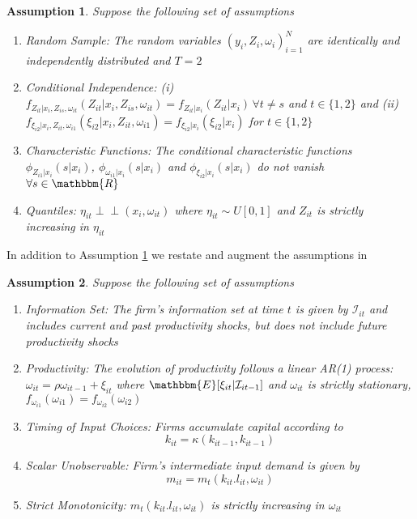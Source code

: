 \documentclass[11pt]{article}
\newtheorem{assump}{Assumption}[section]
\newcommand{\indep}{\perp \!\!\! \perp}
\begin{document}
\begin{assump} \label{idpart1}
Suppose the following set of assumptions 
	\begin{enumerate}[label=(\alph*)]
		\item Random Sample: The random variables $(y_{i}, Z_{i}, \omega_{i})_{i=1}^{N}$ are identically and independently distributed and $T=2$
		\item Conditional Independence: (i) $f_{Z_{it}|x_{i}, Z_{is}, \omega_{it}}(Z_{it}|x_{i}, Z_{is}, \omega_{it})=f_{Z_{it}|x_{i}}(Z_{it}|x_{i})\, \forall t\neq s$ and $t\in\{1,2\}$ and (ii) $f_{\xi_{i2}|x_{i}, Z_{it}, \omega_{i1}}(\xi_{i2}|x_{i}, Z_{it}, \omega_{i1})=f_{\xi_{i2}|x_{i}}(\xi_{i2}|x_{i})$ for $t\in\{1,2\}$
		\item Characteristic Functions: The conditional characteristic functions $\phi_{Z_{i1}|x_{i}}(s|x_{i})$, $\phi_{\omega_{i1}|x_{i}}(s|x_{i})$ and $\phi_{\xi_{i2}|x_{i}}(s|x_{i})$  do not vanish $\forall s\in \mathbbm{R}$
		\item Quantiles: $\eta_{it}\indep (x_{i}, \omega_{it})$ where $\eta_{it}\sim U[0,1]$ and $Z_{it}$ is strictly increasing in $\eta_{it}$
	\end{enumerate}
\end{assump}
In addition to Assumption \ref{idpart1} we restate and augment the assumptions in \cite{Ackerberg2015}
\begin{assump} \label{idpart2}
Suppose the following set of assumptions 
	\begin{enumerate}[label=(\alph*)]
		\item Information Set: The firm's information set at time $t$ is given by $\mathcal{I}_{it}$ and includes current and past productivity shocks, but does not include future productivity shocks
		\item Productivity: The evolution of productivity follows a linear AR(1) process: $\omega_{it}=\rho\omega_{it-1}+\xi_{it}$ where $\mathbbm{E}[\xi_{it}|\mathcal{I}_{it-1}]$ and $\omega_{it}$ is strictly stationary, $f_{\omega_{i1}}(\omega_{i1})=f_{\omega_{i2}}(\omega_{i2})$
		\item Timing of  Input Choices: Firms accumulate capital according to
		\begin{equation*}
		k_{it}=\kappa(k_{it-1}, k_{it-1})
		\end{equation*}
		\item Scalar Unobservable: Firm's intermediate input demand is given by
		\begin{equation*}
		m_{it}=m_{t}(k_{it}. l_{it}, \omega_{it})
		\end{equation*}
		\item Strict Monotonicity: $m_{t}(k_{it}. l_{it}, \omega_{it})$ is strictly increasing in $\omega_{it}$
	\end{enumerate}
\end{assump}
\end{document}
